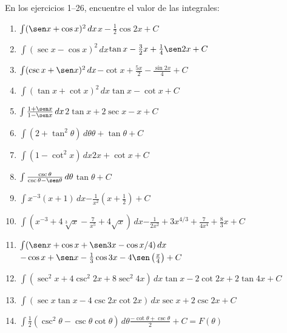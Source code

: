 \begin{ejer}{En los ejercicios 1–26, encuentre el valor de las integrales:}
\begin{enumerate}
\item {$\int (\sen x + \cos x)^{2}\,dx$}{$x - \frac{1}{2}\cos 2x + C$}

\item {$\int (\sec x - \cos x)^{2}\,dx$}{$\tan x - \frac{3}{2}x + \frac{1}{4}\sen 2x + C$}

\item {$\int (\csc x + \sen x)^{2}\,dx$}{$-\cot x + \frac{5x}{2} - \frac{\sin 2x}{4} + C$}

\item {$\int (\tan x + \cot x)^{2}\,dx$}{$\tan x - \cot x + C$}

\item {$\int \frac{1 + \sen x}{1 - \sen x}\,dx$}{$2\tan x + 2\sec x - x + C$}

\item {$\int (2 + \tan^{2}\theta)\,d\theta$}{$\theta + \tan \theta + C$}

\item {$\int (1 - \cot^{2}x)\,dx$}{$2x + \cot x + C$}

\item {$\int \frac{\csc \theta}{\csc \theta - \sen \theta}\,d\theta$}{$\tan \theta + C$}

\item {$\int x^{-3}(x + 1)\,dx$}{$-\frac{1}{x^{2}}\left( x + \frac{1}{2} \right) + C$}

\item {$\int \left( x^{-3} + 4\sqrt[3]{x} - \frac{7}{x^{5}} + 4\sqrt{x} \right)\,dx$}{$-\frac{1}{2x^{2}} + 3x^{4/3} + \frac{7}{4x^{4}} + \frac{8}{3}x + C$}

\item {$\int (\sen x + \cos x + \sen 3x - \cos x/4)\,dx$}{$-\cos x + \sen x - \frac{1}{3}\cos 3x - 4\sen \left( \frac{x}{4} \right) + C$}

\item {$\int (\sec^{2}x + 4\csc^{2}2x + 8\sec^{2}4x)\,dx$}{$\tan x - 2\cot 2x + 2\tan 4x + C$}

\item {$\int (\sec x \tan x - 4\csc 2x \cot 2x)\,dx$}{$\sec x + 2\csc 2x + C$}

\item {$\int \frac{1}{2}(\csc^{2}\theta - \csc \theta \cot \theta)\,d\theta$}{$\frac{-\cot \theta + \csc \theta}{2} + C = F(\theta)$}
\end{enumerate}
\end{ejer}




